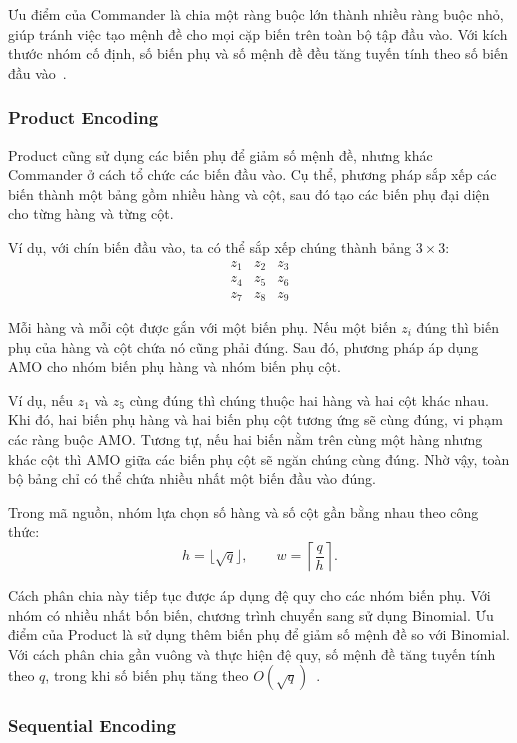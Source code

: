 \documentclass[a4paper,fleqn]{cas-sc}
\begin{document}
Ưu điểm của Commander là chia một ràng buộc lớn thành nhiều ràng buộc nhỏ, giúp tránh việc tạo mệnh đề cho mọi cặp biến trên toàn bộ tập đầu vào. Với kích thước nhóm cố định, số biến phụ và số mệnh đề đều tăng tuyến tính theo số biến đầu vào~\cite{commander}.

\subsubsection{Product Encoding}

Product cũng sử dụng các biến phụ để giảm số mệnh đề, nhưng khác Commander ở cách tổ chức các biến đầu vào. Cụ thể, phương pháp sắp xếp các biến thành một bảng gồm nhiều hàng và cột, sau đó tạo các biến phụ đại diện cho từng hàng và từng cột.

Ví dụ, với chín biến đầu vào, ta có thể sắp xếp chúng thành bảng $3\times3$:
\[
\begin{matrix}
z_1 & z_2 & z_3\\
z_4 & z_5 & z_6\\
z_7 & z_8 & z_9
\end{matrix}
\]

Mỗi hàng và mỗi cột được gắn với một biến phụ. Nếu một biến $z_i$ đúng thì biến phụ của hàng và cột chứa nó cũng phải đúng. Sau đó, phương pháp áp dụng AMO cho nhóm biến phụ hàng và nhóm biến phụ cột.

Ví dụ, nếu $z_1$ và $z_5$ cùng đúng thì chúng thuộc hai hàng và hai cột khác nhau. Khi đó, hai biến phụ hàng và hai biến phụ cột tương ứng sẽ cùng đúng, vi phạm các ràng buộc AMO. Tương tự, nếu hai biến nằm trên cùng một hàng nhưng khác cột thì AMO giữa các biến phụ cột sẽ ngăn chúng cùng đúng. Nhờ vậy, toàn bộ bảng chỉ có thể chứa nhiều nhất một biến đầu vào đúng.

Trong mã nguồn, nhóm lựa chọn số hàng và số cột gần bằng nhau theo công thức:
\[
h=\lfloor\sqrt q\rfloor,\qquad w=\left\lceil\frac{q}{h}\right\rceil.
\]

Cách phân chia này tiếp tục được áp dụng đệ quy cho các nhóm biến phụ. Với nhóm có nhiều nhất bốn biến, chương trình chuyển sang sử dụng Binomial. Ưu điểm của Product là sử dụng thêm biến phụ để giảm số mệnh đề so với Binomial. Với cách phân chia gần vuông và thực hiện đệ quy, số mệnh đề tăng tuyến tính theo $q$, trong khi số biến phụ tăng theo $O(\sqrt q)$~\cite{product}.

\subsubsection{Sequential Encoding}
\end{document}
